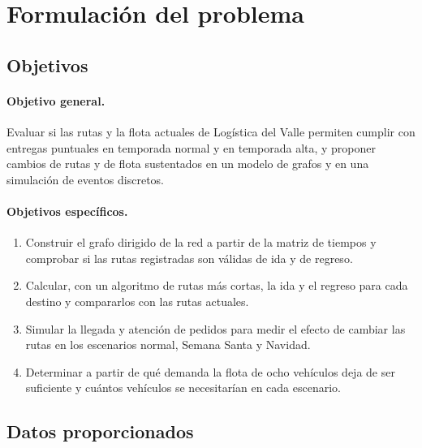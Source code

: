 \documentclass[11pt,letterpaper]{article}
\begin{document}
\section{Formulación del problema}

\subsection{Objetivos}

\paragraph{Objetivo general.} Evaluar si las rutas y la flota actuales de Logística del Valle permiten cumplir con entregas puntuales en temporada normal y en temporada alta, y proponer cambios de rutas y de flota sustentados en un modelo de grafos y en una simulación de eventos discretos.

\paragraph{Objetivos específicos.}
\begin{enumerate}
  \item Construir el grafo dirigido de la red a partir de la matriz de tiempos y comprobar si las rutas registradas son válidas de ida y de regreso.
  \item Calcular, con un algoritmo de rutas más cortas, la ida y el regreso para cada destino y compararlos con las rutas actuales.
  \item Simular la llegada y atención de pedidos para medir el efecto de cambiar las rutas en los escenarios normal, Semana Santa y Navidad.
  \item Determinar a partir de qué demanda la flota de ocho vehículos deja de ser suficiente y cuántos vehículos se necesitarían en cada escenario.
\end{enumerate}

\subsection{Datos proporcionados}
\end{document}
